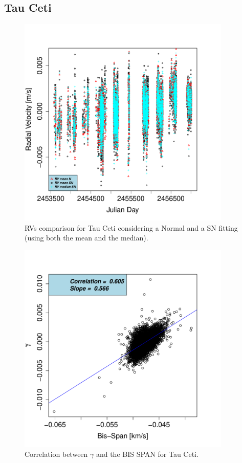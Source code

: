 \documentclass[11pt, oneside]{article}
\begin{document}
\subsection{Tau Ceti}  \label{sec:Taucet}
%
\begin{figure}[htbp]
   \centering
\includegraphics[height = 4in]{[0]TauCeti_vs_time.pdf} 
   \caption{RVs comparison for Tau Ceti considering a Normal and a SN fitting (using both the mean and the median).}
   \label{fig:Tau Ceti:RV}
\end{figure}
%
\begin{figure}[htbp]
   \centering
\includegraphics[height = 4in]{HD10700_[2]gamma_vs_bisspan.pdf} 
   \caption{Correlation between $\gamma$ and the BIS SPAN for Tau Ceti.}
   \label{fig:Tau:corr.gamma}
\end{figure}
\end{document}
